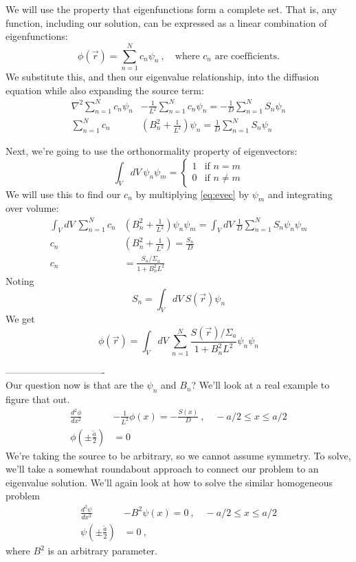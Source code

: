 \documentclass[12pt]{article}
\begin{document}
We will use the property that eigenfunctions form a complete set. That is, any function, including our solution, can be expressed as a linear combination of eigenfunctions:
\[
\phi(\vec{r}) = \sum_{n=1}^N c_n \psi_n\:, \quad \text{where } c_n \text{ are coefficients.}
\]
We substitute this, and then our eigenvalue relationship, into the diffusion equation while also expanding the source term:
\begin{align}
\nabla^2\sum_{n=1}^N c_n \psi_n &- \frac{1}{L^2}\sum_{n=1}^N c_n \psi_n = -\frac{1}{D} \sum_{n=1}^N S_n \psi_n \nonumber \\
%
\sum_{n=1}^N c_n &(B_n^2 + \frac{1}{L^2})\psi_n = \frac{1}{D} \sum_{n=1}^N S_n \psi_n
\label{eq:evec}
\end{align}

Next, we're going to use the orthonormality property of eigenvectors:
\[
\int_V dV\: \psi_n \psi_m = \left\{
	\begin{array}{ll}
		1  & \mbox{if } n = m \\
		0 & \mbox{if } n \neq m
	\end{array}
	\right.
\]
We will use this to find our $c_n$ by multiplying \autoref{eq:evec} by $\psi_m$ and integrating over volume:
\begin{align*}
\int_V dV\: \sum_{n=1}^N c_n &(B_n^2 + \frac{1}{L^2})\psi_n \psi_m = \int_V dV\:\frac{1}{D}\sum_{n=1}^N S_n \psi_n \psi_m \\
%
c_n &(B_n^2 + \frac{1}{L^2}) = \frac{S_n}{D} \\
c_n &= \frac{S_n / \Sigma_a}{1 + B_n^2  L^2}
\end{align*}
Noting 
\[
S_n = \int_V dV\: S(\vec{r}) \psi_n
\]
We get
\[
\phi(\vec{r}) = \int_V dV\:\sum_{n=1}^N \frac{S(\vec{r}) / \Sigma_a}{1 + B_n^2  L^2} \psi_n \psi_n 
\]


-------------------------------\\
Our question now is that are the $\psi_n$ and $B_n$?
We'll look at a real example to figure that out. %
\begin{align*}
\frac{d^2 \phi}{dx^2} &- \frac{1}{L^2} \phi(x) = -\frac{S(x)}{D}\:, \quad -a/2 \leq x \leq a/2\\
\phi(\pm \frac{\tilde{a}}{2}) &= 0
\end{align*}
%
We're taking the source to be arbitrary, so we cannot assume symmetry. To solve, we'll take a somewhat roundabout approach to connect our problem to an eigenvalue solution. We'll again look at how to solve the similar homogeneous problem
\begin{align*}
\frac{d^2 \psi}{dx^2} &- B^2 \psi(x) = 0\:, \quad -a/2 \leq x \leq a/2\\
\psi(\pm \frac{\tilde{a}}{2}) &= 0\:,
\end{align*}
where $B^2$ is an arbitrary parameter.
\end{document}
